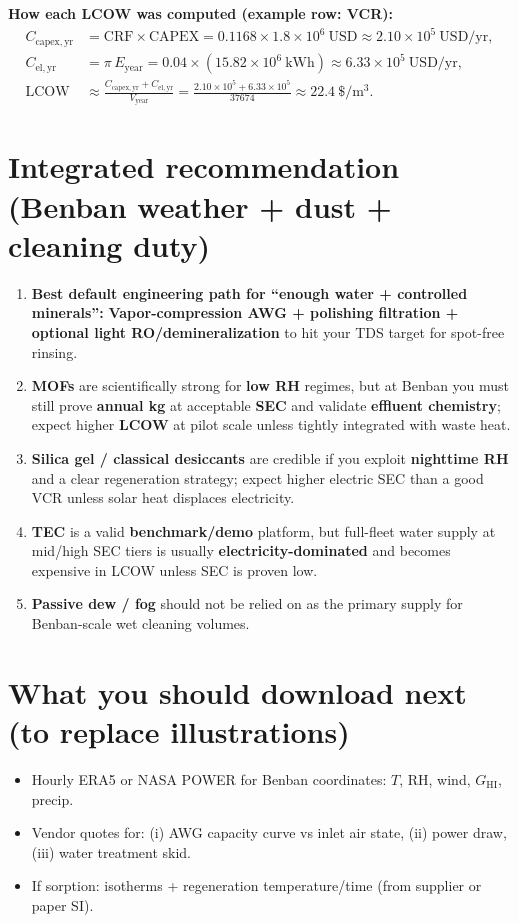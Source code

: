 \documentclass[11pt,a4paper]{article}
\begin{document}
\noindent\textbf{How each LCOW was computed (example row: VCR):}
\begin{align*}
C_{\mathrm{capex,yr}} &= \mathrm{CRF}\times \mathrm{CAPEX}
=0.1168\times 1.8\times 10^6\ \mathrm{USD}\approx 2.10\times 10^5\ \mathrm{USD/yr},\\
C_{\mathrm{el,yr}} &= \pi\,E_{\mathrm{year}}
=0.04\times (15.82\times 10^6\ \mathrm{kWh})\approx 6.33\times 10^5\ \mathrm{USD/yr},\\
\mathrm{LCOW} &\approx \frac{C_{\mathrm{capex,yr}}+C_{\mathrm{el,yr}}}{V_{\mathrm{year}}}
=\frac{2.10\times 10^5+6.33\times 10^5}{37674}\approx 22.4\ \mathrm{\$/m^3}.
\end{align*}

\section{Integrated recommendation (Benban weather + dust + cleaning duty)}
\begin{enumerate}[leftmargin=*]
  \item \textbf{Best default engineering path for ``enough water + controlled minerals'':} \textbf{Vapor-compression AWG + polishing filtration + optional light RO/demineralization} to hit your TDS target for spot-free rinsing.
  \item \textbf{MOFs} are scientifically strong for \textbf{low RH} regimes, but at Benban you must still prove \textbf{annual kg} at acceptable \textbf{SEC} and validate \textbf{effluent chemistry}; expect higher \textbf{LCOW} at pilot scale unless tightly integrated with waste heat.
  \item \textbf{Silica gel / classical desiccants} are credible if you exploit \textbf{nighttime RH} and a clear regeneration strategy; expect higher electric SEC than a good VCR unless solar heat displaces electricity.
  \item \textbf{TEC} is a valid \textbf{benchmark/demo} platform, but full-fleet water supply at mid/high SEC tiers is usually \textbf{electricity-dominated} and becomes expensive in LCOW unless SEC is proven low.
  \item \textbf{Passive dew / fog} should not be relied on as the primary supply for Benban-scale wet cleaning volumes.
\end{enumerate}

\section{What you should download next (to replace illustrations)}
\begin{itemize}[leftmargin=*]
  \item Hourly ERA5 or NASA POWER for Benban coordinates: $T$, RH, wind, $G_{\mathrm{HI}}$, precip.
  \item Vendor quotes for: (i) AWG capacity curve vs inlet air state, (ii) power draw, (iii) water treatment skid.
  \item If sorption: isotherms + regeneration temperature/time (from supplier or paper SI).
\end{itemize}
\end{document}
